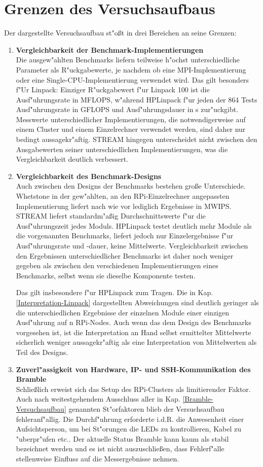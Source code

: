 \section{Grenzen des Versuchsaufbaus}\label{Grenzen}
Der dargestellte Versuchsaufbau st"o\ss t in drei Bereichen an seine Grenzen: 
\begin{enumerate}
	\item \textbf{Vergleichbarkeit der Benchmark-Implementierungen}\\ 
Die ausgew"ahlten Benchmarks liefern teilweise h"ochst unterschiedliche Parameter als R"uckgabewerte, je nachdem ob eine MPI-Implementierung oder eine Single-CPU-Imple\-mentierung verwendet wird. Das gilt besonders f"Ur Linpack: Einziger R"uckgabewert f"ur Linpack 100 ist die Ausf"uhrungsrate in MFLOPS, w"ahrend HPLinpack f"ur jeden der 864 Tests Ausf"uhrungsrate in GFLOPS und Ausf"uhrungsdauer in s zur"uckgibt. Messwerte unterschiedlicher Implementierungen, die notwendigerweise auf einem Cluster und einem Einzelrechner verwendet werden, sind daher nur bedingt aussagekr"aftig. STREAM hingegen unterscheidet nicht zwischen den Ausgabewerten seiner unterschiedlichen Implementierungen, was die Vergleichbarkeit deutlich verbessert. 
	\item \textbf{Vergleichbarkeit des Benchmark-Designs}\\
Auch zwischen den Designs der Benchmarks bestehen gro\ss e Unterschiede. Whetstone in der gew"ahlten, an den RPi-Einzelrechner angepassten Implementierung liefert nach wie vor lediglich Ergebnisse in MWIPS. STREAM liefert standardm"a\ss ig Durchschnittswerte f"ur die Ausf"uhrungszeit jedes Moduls. HPLinpack testet deutlich mehr Module als die vorgenannten Benchmarks, liefert jedoch nur Einzelergebnisse f"ur Ausf"uhrungsrate und -dauer, keine Mittelwerte. Vergleichbarkeit zwischen den Ergebnissen unterschiedlicher Benchmarks ist daher noch weniger gegeben als zwischen den verschiedenen Implementierungen eines Benchmarks, selbst wenn sie dieselbe Komponente testen. 

Das gilt insbesondere f"ur HPLinpack zum Tragen. Die in Kap. \ref{Interpretation-Linpack} dargestellten Abweichungen sind deutlich geringer als die unterschiedlichen Ergebnisse der einzelnen Module einer einzigen Ausf"uhrung auf n RPi-Nodes. Auch wenn das dem Design des Benchmarks vorgesehen ist, ist die Interpretation an Hand selbst ermittelter Mittelwerte sicherlich weniger aussagekr"aftig als eine Interpretation von Mittelwerten als Teil des Designs. 
	\item \textbf{Zuverl"assigkeit von Hardware, IP- und SSH-Kommunikation des Bramble}\\
Schlie\ss lich erweist sich das Setup des RPi-Clusters als limitierender Faktor. Auch nach weitestgehendem Ausschluss aller in Kap. \ref{Bramble-Versuchsaufbau} genannten St"orfaktoren blieb der Versuchsaufbau fehleranf"allig. Die Durchf"uhrung erforderte i.d.R. die Anwesenheit einer Aufsichtsperson, um bei St"orungen die LEDs zu kontrollieren, Kabel zu "uberpr"ufen etc.. Der aktuelle Status Bramble kann kaum als stabil bezeichnet werden und es ist nicht auszuschlie\ss en, dass Fehlerf"alle stellenweise Einfluss auf die Messergebnisse nehmen. 


\end{enumerate}
